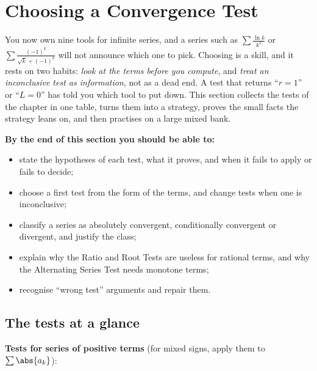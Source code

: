 \documentclass[11pt]{article}
\begin{document}
\section{Choosing a Convergence Test}

\begin{guide}
You now own nine tools for infinite series, and a series such as $\sum\frac{\ln k}{k^2}$ or $\sum\frac{(-1)^k}{\sqrt k+(-1)^k}$ will not announce which one to pick. Choosing is a skill, and it rests on two habits: \emph{look at the terms before you compute}, and \emph{treat an inconclusive test as information}, not as a dead end. A test that returns ``$r=1$'' or ``$L=0$'' has told you which tool to put down. This section collects the tests of the chapter in one table, turns them into a strategy, proves the small facts the strategy leans on, and then practises on a large mixed bank.
\end{guide}

\textbf{By the end of this section you should be able to:}
\begin{itemize}
  \item state the hypotheses of each test, what it proves, and when it fails to apply or fails to decide;
  \item choose a first test from the form of the terms, and change tests when one is inconclusive;
  \item classify a series as absolutely convergent, conditionally convergent or divergent, and justify the class;
  \item explain why the Ratio and Root Tests are useless for rational terms, and why the Alternating Series Test needs monotone terms;
  \item recognise ``wrong test'' arguments and repair them.
\end{itemize}

\subsection*{The tests at a glance}

\textbf{Tests for series of positive terms} (for mixed signs, apply them to $\sum\abs{a_k}$):
\end{document}
